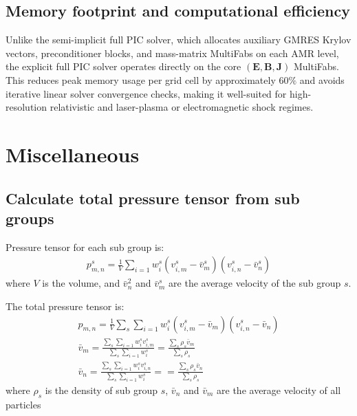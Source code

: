 \documentclass[a4paper, 11pt]{article}
\begin{document}
\subsection{Memory footprint and computational efficiency}

Unlike the semi-implicit full PIC solver, which allocates auxiliary GMRES Krylov vectors, preconditioner blocks, and mass-matrix MultiFabs on each AMR level, the explicit full PIC solver operates directly on the core $(\mathbf{E}, \mathbf{B}, \mathbf{J})$ MultiFabs. This reduces peak memory usage per grid cell by approximately $60\%$ and avoids iterative linear solver convergence checks, making it well-suited for high-resolution relativistic and laser-plasma or electromagnetic shock regimes.

\section{Miscellaneous}
\subsection{Calculate total pressure tensor from sub groups}
Pressure tensor for each sub group is:
\begin{eqnarray}
    p^s_{m,n} = \frac{1}{V} \sum_{i=1} w_i^s (v_{i,m}^s-\bar{v}_m^s) (v_{i,n}^s-\bar{v}_n^s) 
\end{eqnarray}
where $V$ is the volume, and $\bar{v}_n^2$ and $\bar{v}_m^s$ are the average velocity of the sub group $s$. 

The total pressure tensor is:
\begin{eqnarray}
    p_{m,n} = \frac{1}{V} \sum_{s}\sum_{i=1} w_i^s (v_{i,m}^s-\bar{v}_m) (v_{i,n}^s-\bar{v}_n)\\
    \bar{v}_m = \frac{\sum_{s}\sum_{i=1} w_i^s v_{i,m}^s}{\sum_{s}\sum_{i=1} w_i^s} = \frac{\sum_s \rho_s \bar{v}_m}{\sum_{s}\rho_s} \\
    \bar{v}_n = \frac{\sum_{s}\sum_{i=1} w_i^s v_{i,n}^s}{\sum_{s}\sum_{i=1} w_i^s} = = \frac{\sum_s \rho_s \bar{v}_n}{\sum_{s}\rho_s}
\end{eqnarray}
where $\rho_s$ is the density of sub group $s$, $\bar{v}_n$ and $\bar{v}_m$ are the average velocity of all particles
\end{document}

